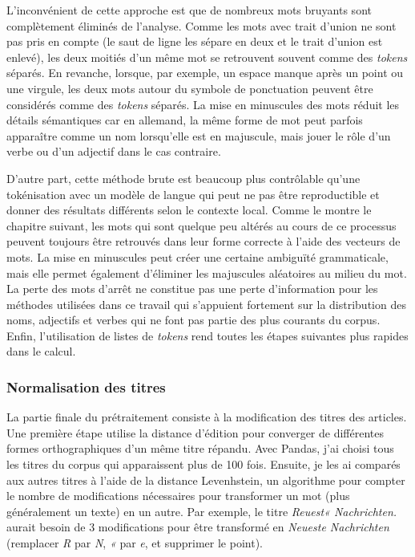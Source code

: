 \documentclass[a4paper,twoside,12pt]{article}
\begin{document}
L'inconvénient de cette approche est que de nombreux mots bruyants sont complètement éliminés de l'analyse. Comme les mots avec trait d'union ne sont pas pris en compte  (le saut de ligne les sépare en deux et le trait d'union est enlevé), les deux moitiés d'un même mot se retrouvent souvent comme des \textit{tokens} séparés. En revanche, lorsque, par exemple, un espace manque après un point ou une virgule, les deux mots autour du symbole de ponctuation peuvent être considérés comme des \textit{tokens} séparés. La mise en minuscules des mots réduit les détails sémantiques car en allemand, la même forme de mot peut parfois apparaître comme un nom lorsqu'elle est en majuscule, mais jouer le rôle d'un verbe ou d'un adjectif dans le cas contraire.

D'autre part, cette méthode brute est beaucoup plus contrôlable qu'une tokénisation avec un modèle de langue qui peut ne pas être reproductible et donner des résultats différents selon le contexte local. Comme le montre le chapitre suivant, les mots qui sont quelque peu altérés au cours de ce processus peuvent toujours être retrouvés dans leur forme correcte à l'aide des vecteurs de mots. La mise en minuscules peut créer une certaine ambiguïté grammaticale, mais elle permet également d'éliminer les majuscules aléatoires au milieu du mot. La perte des mots d'arrêt ne constitue pas une perte d'information pour les méthodes utilisées dans ce travail qui s'appuient fortement sur la distribution des noms, adjectifs et verbes qui ne font pas partie des plus courants du corpus. Enfin, l'utilisation de listes de \textit{tokens} rend toutes les étapes suivantes plus rapides dans le calcul.

\subsubsection{Normalisation des titres} \label{normalisation_titres}

La partie finale du prétraitement consiste à la modification des titres des articles. Une première étape utilise la distance d'édition pour converger de différentes formes orthographiques d'un même titre répandu. Avec Pandas, j'ai choisi tous les titres du corpus qui apparaissent plus de 100 fois. Ensuite, je les ai comparés aux autres titres à l'aide de la distance Levenhstein, un algorithme pour compter le nombre de modifications nécessaires pour transformer un mot (plus généralement un texte) en un autre. Par exemple, le titre \textit{Reuest« Nachrichten.} aurait besoin de 3 modifications pour être transformé en \textit{Neueste Nachrichten} (remplacer \textit{R} par \textit{N}, \textit{«} par \textit{e}, et supprimer le point).
\end{document}
